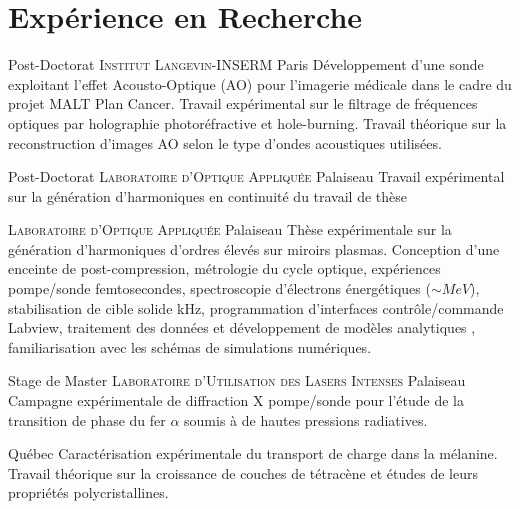 \documentclass[11pt,a4paper,sans]{moderncv} %
\begin{document}

\section{Expérience en Recherche}


{Post-Doctorat}
{\textsc{Institut Langevin-INSERM}}
{Paris}
{}
{Développement d'une sonde exploitant l'effet Acousto-Optique (AO) pour l'imagerie médicale dans le cadre du projet MALT Plan Cancer. Travail expérimental sur le filtrage de fréquences optiques par holographie photoréfractive et hole-burning. Travail théorique sur la reconstruction d'images AO selon le type d'ondes acoustiques utilisées.}

{Post-Doctorat}
{\textsc{Laboratoire d'Optique Appliquée}}
{Palaiseau}
{}
{Travail expérimental sur la génération d'harmoniques en continuité du travail de thèse}

{%
\textsc{Laboratoire d'Optique Appliquée}}
{%
Palaiseau}
{}
{%
Thèse expérimentale sur la génération d'harmoniques d'ordres élevés sur miroirs plasmas. Conception d'une enceinte de post-compression, métrologie du cycle optique,  expériences pompe/sonde femtosecondes, spectroscopie d'électrons énergétiques ($\sim MeV$), stabilisation de cible solide kHz, programmation d'interfaces contrôle/commande Labview, traitement des données et développement de modèles analytiques , familiarisation avec les schémas de simulations numériques.
}


{Stage de Master}
{\textsc{Laboratoire d'Utilisation des Lasers Intenses}}
{Palaiseau}
{}
{Campagne expérimentale de diffraction X pompe/sonde pour l'étude de la transition de phase du fer $\alpha$ soumis à de hautes pressions radiatives.}




{Québec}
{}
{Caractérisation expérimentale du transport de charge dans la mélanine. Travail théorique sur la croissance de couches de tétracène et études de leurs propriétés polycristallines.}
\end{document}
